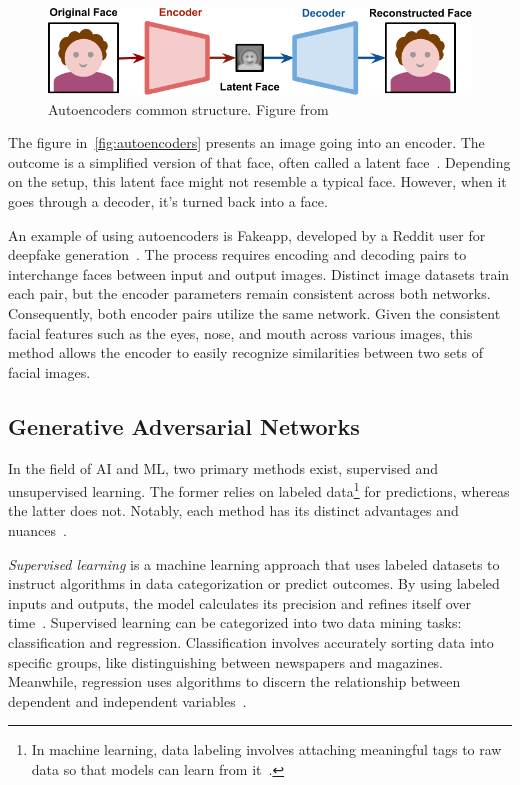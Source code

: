 \begin{figure}[ht]
	\centering
	\includegraphics[scale=0.45]{figures/deepfakes_00d}
	\caption{Autoencoders common structure. Figure from~\cite{autoencoders-image-alazucconi}}\label{fig:autoencoders}
\end{figure}

The figure in~\autoref{fig:autoencoders} presents an image going
into an encoder. The outcome is a simplified version of that face, often called a latent face~\cite{autoencoders-image-alazucconi}.
Depending on the setup, this latent face might not resemble a typical face. However, when it goes
through a decoder, it's turned back into a face.

An example of using autoencoders is Fakeapp, developed by a Reddit user for deepfake generation~\cite{s22124556,fakeapp-app}.
The process requires encoding and decoding pairs to interchange faces between input and
output images. Distinct image datasets train each pair, but the encoder parameters remain
consistent across both networks. Consequently, both encoder pairs utilize the same network. Given
the consistent facial features such as the eyes, nose, and mouth across various images,
this method allows the encoder to easily recognize similarities between two sets of facial images.

\subsection{Generative Adversarial Networks}
In the field of \ac{AI} and \ac{ML}, two primary methods exist, supervised and unsupervised learning.
The former relies on labeled data\footnote{In machine learning, data labeling involves attaching
	meaningful tags to raw data so that models can learn from it~\cite{labeled-data}.}
for predictions, whereas the latter does not. Notably, each method has its distinct advantages and
nuances~\cite{ibm-machine-learning}.

\textit{Supervised learning} is a machine learning approach that uses labeled datasets to
instruct algorithms in data categorization or predict outcomes. By using labeled inputs and outputs,
the model calculates its precision and refines itself over time~\cite{supervised-unsupervised}.
Supervised learning can be categorized into two data mining tasks: classification and regression.
Classification involves accurately sorting data into specific groups, like distinguishing between
newspapers and magazines. Meanwhile, regression uses algorithms to discern the relationship between
dependent and independent variables~\cite{ibm-machine-learning}.

